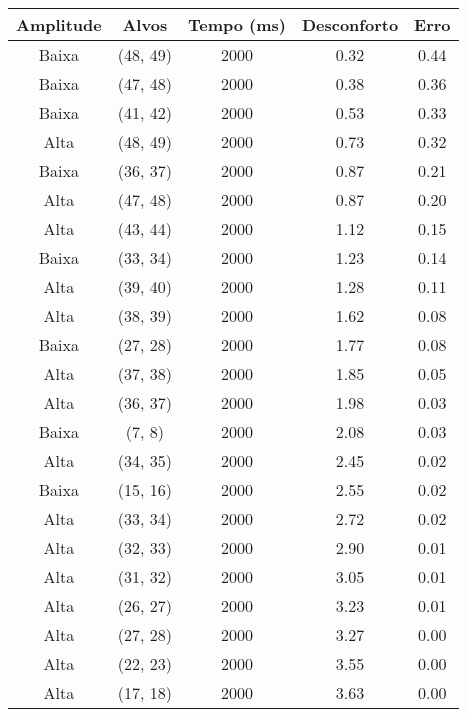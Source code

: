 \begin{tabular}{c c c c c}
\hline
Amplitude & Alvos & Tempo (ms) & Desconforto & Erro \\
\hline
Baixa & (48, 49) &  2000 & 0.32 & 0.44 \\
Baixa & (47, 48) &  2000 & 0.38 & 0.36 \\
Baixa & (41, 42) &  2000 & 0.53 & 0.33 \\
Alta & (48, 49) &  2000 & 0.73 & 0.32 \\
Baixa & (36, 37) &  2000 & 0.87 & 0.21 \\
Alta & (47, 48) &  2000 & 0.87 & 0.20 \\
Alta & (43, 44) &  2000 & 1.12 & 0.15 \\
Baixa & (33, 34) &  2000 & 1.23 & 0.14 \\
Alta & (39, 40) &  2000 & 1.28 & 0.11 \\
Alta & (38, 39) &  2000 & 1.62 & 0.08 \\
Baixa & (27, 28) &  2000 & 1.77 & 0.08 \\
Alta & (37, 38) &  2000 & 1.85 & 0.05 \\
Alta & (36, 37) &  2000 & 1.98 & 0.03 \\
Baixa & (7, 8) &  2000 & 2.08 & 0.03 \\
Alta & (34, 35) &  2000 & 2.45 & 0.02 \\
Baixa & (15, 16) &  2000 & 2.55 & 0.02 \\
Alta & (33, 34) &  2000 & 2.72 & 0.02 \\
Alta & (32, 33) &  2000 & 2.90 & 0.01 \\
Alta & (31, 32) &  2000 & 3.05 & 0.01 \\
Alta & (26, 27) &  2000 & 3.23 & 0.01 \\
Alta & (27, 28) &  2000 & 3.27 & 0.00 \\
Alta & (22, 23) &  2000 & 3.55 & 0.00 \\
Alta & (17, 18) &  2000 & 3.63 & 0.00 \\
\hline
\end{tabular}
